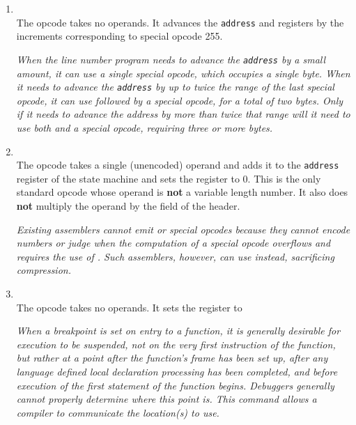 \begin{enumerate}[1. ]
\item \textbf{\DWLNSconstaddpcTARG} \\
The \DWLNSconstaddpcTARG{} opcode takes
no operands. It advances the \texttt{address} and  registers
by the increments corresponding to special opcode 255.

\textit{When the line number program needs to advance the \texttt{address}
by a small amount, it can use a single special opcode,
which occupies a single byte. When it needs to advance the
\texttt{address} by up to twice the range of the last special opcode,
it can use \DWLNSconstaddpc{} followed by a special opcode,
for a total of two bytes. Only if it needs to advance the
address by more than twice that range will it need to use
both \DWLNSadvancepc{} and a special opcode, requiring three
or more bytes.}

\item \textbf{\DWLNSfixedadvancepcTARG} \\ 
The \DWLNSfixedadvancepcTARG{} opcode
takes a single  (unencoded) operand and adds it to the
\texttt{address} register of the state machine and sets the 
register to 0. This is the only standard opcode whose operand
is \textbf{not} a variable length number. It also does 
\textbf{not} multiply the
operand by the  
field of the header.

\textit{Existing assemblers cannot emit 
\DWLNSadvancepc{} or special
opcodes because they cannot encode  numbers or judge when
the computation of a special opcode overflows and requires
the use of \DWLNSadvancepc. Such assemblers, however, can
use \DWLNSfixedadvancepc{} instead, sacrificing compression.}

\item \textbf{\DWLNSsetprologueendTARG} \\
The \DWLNSsetprologueendTARG{}
opcode takes no operands. It sets the 
 register
to 

\textit{When a breakpoint is set on entry to a function, it is
generally desirable for execution to be suspended, not on the
very first instruction of the function, but rather at a point
after the function's frame has been set up, after any language
defined local declaration processing has been completed,
and before execution of the first statement of the function
begins. Debuggers generally cannot properly determine where
this point is. This command allows a compiler to communicate
the location(s) to use.}


\end{enumerate}
